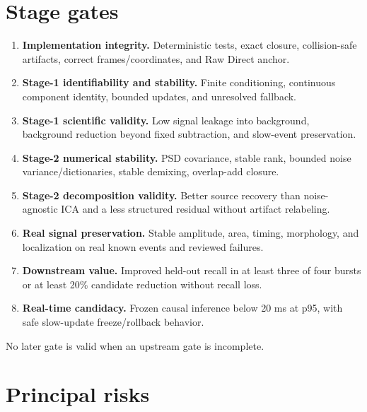 \documentclass[11pt]{article}
\begin{document}
\section{Stage gates}

\begin{enumerate}[leftmargin=*,label=\textbf{C\arabic*:}]
\item \textbf{Implementation integrity.} Deterministic tests, exact closure,
collision-safe artifacts, correct frames/coordinates, and Raw Direct anchor.
\item \textbf{Stage-1 identifiability and stability.} Finite conditioning,
continuous component identity, bounded updates, and unresolved fallback.
\item \textbf{Stage-1 scientific validity.} Low signal leakage into background,
background reduction beyond fixed subtraction, and slow-event preservation.
\item \textbf{Stage-2 numerical stability.} PSD covariance, stable rank, bounded
noise variance/dictionaries, stable demixing, overlap-add closure.
\item \textbf{Stage-2 decomposition validity.} Better source recovery than
noise-agnostic ICA and a less structured residual without artifact relabeling.
\item \textbf{Real signal preservation.} Stable amplitude, area, timing,
morphology, and localization on real known events and reviewed failures.
\item \textbf{Downstream value.} Improved held-out recall in at least three of
four bursts or at least 20\% candidate reduction without recall loss.
\item \textbf{Real-time candidacy.} Frozen causal inference below 20 ms at p95,
with safe slow-update freeze/rollback behavior.
\end{enumerate}
No later gate is valid when an upstream gate is incomplete.

\section{Principal risks}
\end{document}
